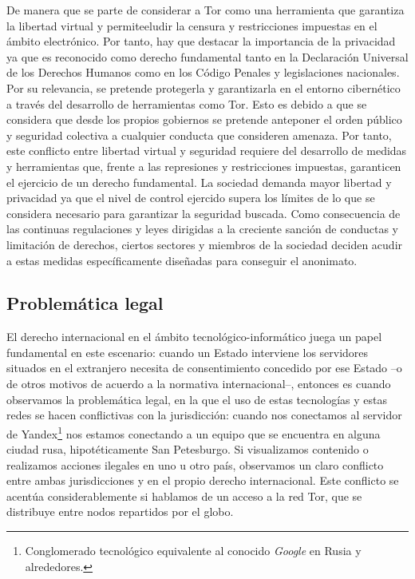 \documentclass[a4paper, 11pt, titlepage]{article}
\begin{document}
        De manera que se parte de considerar a Tor como una herramienta que garantiza la libertad  virtual y permiteeludir
        la censura y restricciones impuestas en el ámbito electrónico. Por tanto, hay que destacar la importancia de la 
        privacidad ya que  es reconocido como derecho fundamental tanto en la Declaración Universal de los Derechos Humanos 
        como en los Código Penales y legislaciones nacionales. Por su relevancia, se pretende protegerla y garantizarla 
        en el entorno cibernético a través del desarrollo de herramientas como  Tor. Esto es debido a que se considera 
        que desde los propios gobiernos se pretende anteponer el orden público y seguridad colectiva a cualquier conducta 
        que consideren amenaza. Por tanto, este conflicto entre libertad virtual y seguridad requiere del desarrollo de 
        medidas y herramientas que, frente a las represiones y restricciones impuestas, garanticen el ejercicio de un 
        derecho fundamental. La sociedad demanda mayor libertad y privacidad ya que el nivel de control ejercido supera 
        los límites de lo que se considera necesario para garantizar la seguridad buscada. Como consecuencia de las 
        continuas regulaciones y leyes dirigidas a la creciente sanción de conductas y limitación de derechos, ciertos 
        sectores y miembros de la sociedad deciden acudir a estas medidas específicamente diseñadas para conseguir el 
        anonimato. 

    \subsection{Problemática legal}

        El derecho internacional en el ámbito tecnológico-informático juega un papel fundamental  en  este  escenario: 
        cuando un Estado interviene los servidores situados en el extranjero necesita de consentimiento concedido por 
        ese Estado --o de otros motivos de acuerdo a la normativa internacional--, entonces es cuando observamos la 
        problemática legal, en la que el uso de estas tecnologías y estas redes se hacen conflictivas con la jurisdicción: 
        cuando nos conectamos al servidor de Yandex\footnote{Conglomerado tecnológico equivalente al conocido \emph{Google} 
        en Rusia y alrededores.} nos estamos conectando a un equipo que se encuentra en alguna ciudad rusa, hipotéticamente 
        San Petesburgo. Si visualizamos contenido o realizamos acciones ilegales en uno u otro país, observamos un claro 
        conflicto entre ambas jurisdicciones y en el propio derecho internacional. Este conflicto se acentúa 
        considerablemente si hablamos de un acceso a la red Tor, que se distribuye entre nodos repartidos por el globo.
\end{document}
